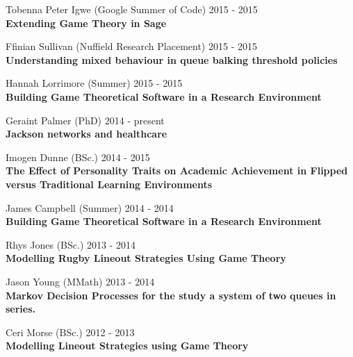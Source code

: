 \documentclass[10pt]{res} %
\begin{document}
\begin{resume}
\begin{etaremune}
\item
    Tobenna Peter Igwe (Google Summer of Code) \hfill 2015 -
    2015\\
\textbf{Extending Game Theory in Sage}\\

\item
    Ffinian Sullivan (Nuffield Research Placement) \hfill 2015 -
    2015\\
\textbf{Understanding mixed behaviour in queue balking threshold policies}\\

\item
    Hannah Lorrimore (Summer) \hfill 2015 -
    2015\\
\textbf{Building Game Theoretical Software in a Research Environment}\\

\item
    Geraint Palmer (PhD) \hfill 2014 -
    present\\
\textbf{Jackson networks and healthcare}\\

\item
    Imogen Dunne (BSc.) \hfill 2014 -
    2015\\
\textbf{The Effect of Personality Traits on Academic Achievement in Flipped versus Traditional Learning Environments}\\

\item
    James Campbell (Summer) \hfill 2014 -
    2014\\
\textbf{Building Game Theoretical Software in a Research Environment}\\

\item
    Rhys Jones (BSc.) \hfill 2013 -
    2014\\
\textbf{Modelling Rugby Lineout Strategies Using Game Theory}\\

\item
    Jason Young (MMath) \hfill 2013 -
    2014\\
\textbf{Markov Decision Processes for the study a system of two queues in series.}\\

\item
    Ceri Morse (BSc.) \hfill 2012 -
    2013\\
\textbf{Modelling Lineout Strategies using Game Theory}\\


\end{etaremune}
\end{resume}
\end{document}
